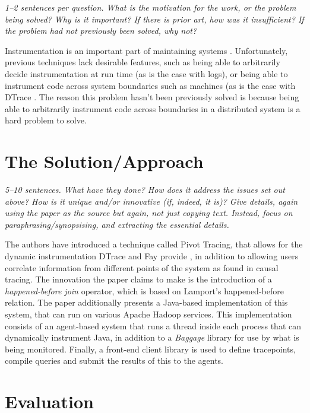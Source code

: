 \documentclass[11pt]{article}
\begin{document}
\textsl{1--2 sentences per question. What is the motivation for the work, or
the problem being solved? Why is it important? If there is prior art, how was
it insufficient? If the problem had not previously been solved, why not?}

Instrumentation is an important part of maintaining systems
\cite{InstrumentationImportance}. Unfortunately, previous techniques lack
desirable features, such as being able to arbitrarily decide instrumentation at
run time (as is the case with logs), or being able to instrument code across
system boundaries such as machines (as is the case with DTrace \cite{DTrace}.
The reason this problem hasn't been previously solved is because being able to
arbitrarily instrument code across boundaries in a distributed system is a hard
problem to solve.


\section*{The Solution/Approach}

\textsl{5--10 sentences. What have they done? How does it address the issues
set out above? How is it unique and/or innovative (if, indeed, it is)? Give
details, again using the paper as the source but again, not just copying text.
Instead, focus on paraphrasing/synopsising, and extracting the essential
details.}

The authors have introduced a technique called Pivot Tracing, that allows for
the dynamic instrumentation DTrace and Fay provide \cite{DTrace}, in addition
to allowing users correlate information from different points of the system as
found in causal tracing. The innovation the paper claims to make is the
introduction of a \textit{happened-before join} operator, which is based on
Lamport's happened-before relation. The paper additionally presents a
Java-based implementation of this system, that can run on various Apache Hadoop
\cite{Hadoop} services. This implementation consists of an agent-based system
that runs a thread inside each process that can dynamically instrument Java, in
addition to a \textit{Baggage} library for use by what is being monitored.
Finally, a front-end client library is used to define tracepoints, compile
queries and submit the results of this to the agents.


\section*{Evaluation}
\end{document}
